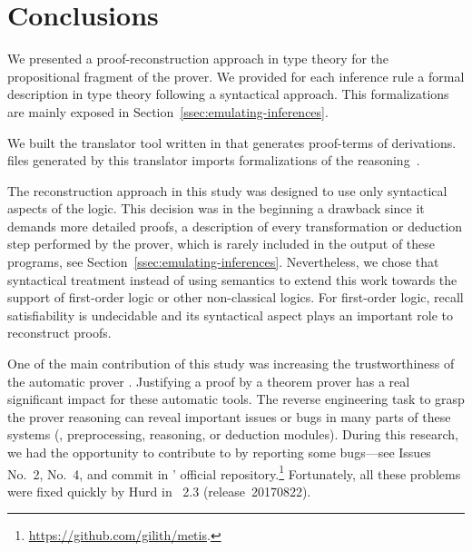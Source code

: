 \documentclass[../main.tex]{subfiles}
\begin{document}

\section{Conclusions}
\label{sec:conclusions}

We presented a proof-reconstruction approach in type theory for the
propositional fragment of the \Metis prover. We provided for each
\Metis inference rule a formal description in type theory following a
syntactical approach. This formalizations are mainly exposed in
Section~\ref{ssec:emulating-inferences}.

We built the \Athena translator tool written in \Haskell
that generates \Agda proof-terms of \Metis derivations.
\Agda files generated by this translator imports
\Agda formalizations of the \Metis reasoning~\cite{AgdaProp,AgdaMetis}.

The reconstruction approach in this study was designed to use
only syntactical aspects of the logic.
This decision was in the beginning a drawback
since it demands more detailed proofs, a
description of every transformation or deduction step performed by
the prover, which is rarely included in the output of these programs,
see Section~\ref{ssec:emulating-inferences}.
Nevertheless, we chose that syntactical treatment instead of using
semantics to extend this work towards the support of first-order
logic or other non-classical logics.
For first-order logic, recall satisfiability is undecidable and
its syntactical aspect plays an important role to reconstruct proofs.

One of the main contribution of this study was increasing the
trustworthiness of the automatic prover \Metis. Justifying a proof by
a theorem prover has a real significant impact for these automatic
tools.  The reverse engineering task to grasp the prover
reasoning can reveal important issues or bugs in many parts of these
systems (\eg, preprocessing, reasoning, or deduction modules). During
this research, we had the opportunity to contribute to \Metis by
reporting some bugs---see Issues No.~2, No.~4, and commit
 in \Metis' official
repository.\footnote{\url{https://github.com/gilith/metis}.}
Fortunately, all these problems were fixed quickly by Hurd in
\Metis~2.3 (release~20170822).
\end{document}
